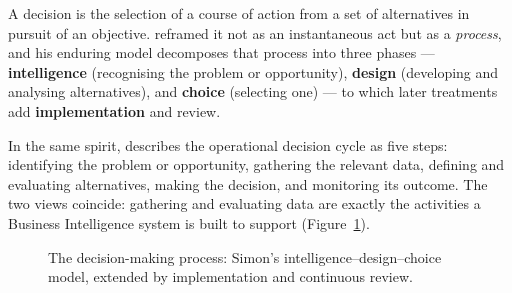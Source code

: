 A decision is the selection of a course of action from a set of alternatives in pursuit of an
objective. \textcite{simon1947} reframed it not as an instantaneous act but as a \emph{process}, and
his enduring model decomposes that process into three phases --- \textbf{intelligence} (recognising the
problem or opportunity), \textbf{design} (developing and analysing alternatives), and \textbf{choice}
(selecting one) \parencite{simon1960} --- to which later treatments add \textbf{implementation} and review.

In the same spirit, \textcite{abbas2024bi} describes the operational decision cycle as five steps:
identifying the problem or opportunity, gathering the relevant data, defining and evaluating
alternatives, making the decision, and monitoring its outcome. The two views coincide: gathering and
evaluating data are exactly the activities a Business Intelligence system is built to support
(Figure~\ref{fig:ch1-decision-process}).

\begin{figure}[htbp]
\centering
{}
\caption{The decision-making process: Simon's intelligence--design--choice model, extended by
implementation and continuous review.}
\label{fig:ch1-decision-process}
\end{figure}

